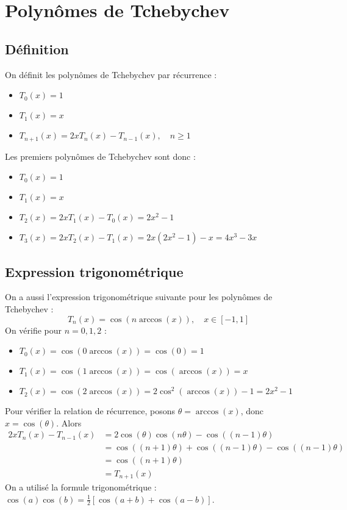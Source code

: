 \documentclass{article}
\begin{document}
\sloppy

\section{Polynômes de Tchebychev}

\subsection{Définition}

On définit les polynômes de Tchebychev par récurrence :
\begin{itemize}
    \item $T_0(x) = 1$
    \item $T_1(x) = x$
    \item $T_{n+1}(x) = 2xT_n(x) - T_{n-1}(x), \quad n \geq 1$
\end{itemize}
Les premiers polynômes de Tchebychev sont donc :
\begin{itemize}
    \item $T_0(x) = 1$
    \item $T_1(x) = x$
    \item $T_2(x) = 2xT_1(x) - T_0(x) = 2x^2 - 1$
    \item $T_3(x) = 2xT_2(x) - T_1(x) = 2x(2x^2 - 1) - x = 4x^3 - 3x$
\end{itemize}

\subsection{Expression trigonométrique}

On a aussi l'expression trigonométrique suivante pour les polynômes de Tchebychev :
\[
T_n(x) = \cos(n \arccos(x)), \quad x \in [-1, 1]
\]
On vérifie pour $n=0, 1, 2$ :
\begin{itemize}
    \item $T_0(x) = \cos(0 \arccos(x)) = \cos(0) = 1$
    \item $T_1(x) = \cos(1 \arccos(x)) = \cos(\arccos(x)) = x$
    \item $T_2(x) = \cos(2 \arccos(x)) = 2\cos^2(\arccos(x)) - 1 = 2x^2 - 1$
\end{itemize}
Pour vérifier la relation de récurrence, posons $\theta = \arccos(x)$, donc $x = \cos(\theta)$. Alors
\begin{align*}
2xT_n(x) - T_{n-1}(x) &= 2\cos(\theta)\cos(n\theta) - \cos((n-1)\theta) \\
&= \cos((n+1)\theta) + \cos((n-1)\theta) - \cos((n-1)\theta) \\
&= \cos((n+1)\theta) \\
&= T_{n+1}(x)
\end{align*}
On a utilisé la formule trigonométrique : $\cos(a)\cos(b) = \frac{1}{2} [\cos(a+b) + \cos(a-b)]$.
\end{document}
